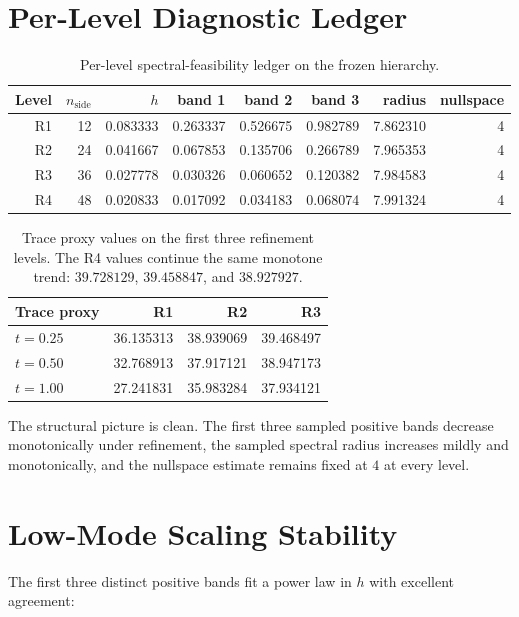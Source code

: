 \documentclass[11pt]{article}
\begin{document}
\section{Per-Level Diagnostic Ledger}

\begin{table}[t]
\centering
\small
\begin{tabular}{@{}rrrrrrrr@{}}
\toprule
Level & $n_{\mathrm{side}}$ & $h$ & band 1 & band 2 & band 3 & radius & nullspace \\
\midrule
R1 & 12 & 0.083333 & 0.263337 & 0.526675 & 0.982789 & 7.862310 & 4 \\
R2 & 24 & 0.041667 & 0.067853 & 0.135706 & 0.266789 & 7.965353 & 4 \\
R3 & 36 & 0.027778 & 0.030326 & 0.060652 & 0.120382 & 7.984583 & 4 \\
R4 & 48 & 0.020833 & 0.017092 & 0.034183 & 0.068074 & 7.991324 & 4 \\
\bottomrule
\end{tabular}
\caption{Per-level spectral-feasibility ledger on the frozen hierarchy.}
\label{tab:levels}
\end{table}

\begin{table}[t]
\centering
\small
\begin{tabular}{@{}lrrr@{}}
\toprule
Trace proxy & R1 & R2 & R3 \\
\midrule
$t = 0.25$ & 36.135313 & 38.939069 & 39.468497 \\
$t = 0.50$ & 32.768913 & 37.917121 & 38.947173 \\
$t = 1.00$ & 27.241831 & 35.983284 & 37.934121 \\
\bottomrule
\end{tabular}
\caption{Trace proxy values on the first three refinement levels. The R4 values continue the same monotone trend: $39.728129$, $39.458847$, and $38.927927$.}
\label{tab:trace}
\end{table}

The structural picture is clean. The first three sampled positive bands decrease monotonically under refinement, the sampled spectral radius increases mildly and monotonically, and the nullspace estimate remains fixed at $4$ at every level.

\section{Low-Mode Scaling Stability}

The first three distinct positive bands fit a power law in $h$ with excellent agreement:
\end{document}
